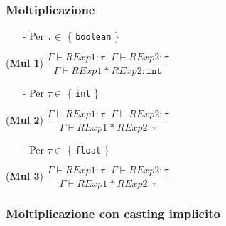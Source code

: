 \documentclass[12pt]{article}
\begin{document}
\subsubsection*{Moltiplicazione}
\begin{center}

\begin{itemize}
\item[-] Per $\tau \in$ \{ \texttt{boolean} \}
\end{itemize}
\noindent(\textbf{Mul 1})
$\dfrac{\Gamma \vdash RExp1:\tau\ \ \ \Gamma \vdash RExp2:\tau}{\Gamma \vdash RExp1\ \texttt{*}\ RExp2:\texttt{int}}$\\[0.1in]

\begin{itemize}
\item[-] Per $\tau \in$ \{ \texttt{int} \}
\end{itemize}
\noindent(\textbf{Mul 2})
$\dfrac{\Gamma \vdash RExp1:\tau\ \ \ \Gamma \vdash RExp2:\tau}{\Gamma \vdash RExp1\ \texttt{*}\ RExp2:\tau}$\\[0.1in]

\begin{itemize}
\item[-] Per $\tau \in$ \{ \texttt{float} \}
\end{itemize}
\noindent(\textbf{Mul 3})
$\dfrac{\Gamma \vdash RExp1:\tau\ \ \ \Gamma \vdash RExp2:\tau}{\Gamma \vdash RExp1\ \texttt{*}\ RExp2:\tau}$\\[0.1in]
\end{center}

\subsubsection*{Moltiplicazione con casting implicito}
\end{document}
